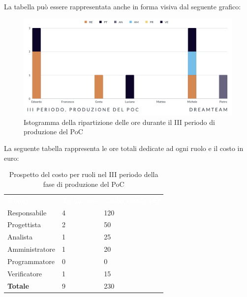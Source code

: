 La tabella può essere rappresentata anche in forma visiva dal seguente grafico:
\begin{figure}[H]
\centering
\includegraphics[scale=0.65]{Sezioni/SezioniPreventivo/grafici/Poc_III_periodo.png}
\caption{Istogramma della ripartizione delle ore durante il III periodo di produzione del PoC}
\end{figure}

La seguente tabella rappresenta le ore totali dedicate ad ogni ruolo e il costo in euro:

\begin{table}[H]
\begin{center}
\renewcommand{\arraystretch}{1.5}
\begin{tabular}{ m{}<{\centering}  m{}<{\centering} m{}<{\centering}}
	\rowcolor{darkblue}
	\textcolor{white}{\textbf{Ruolo}}&\textcolor{white}{\textbf{Totale ore}}&\textcolor{white}{\textbf{Costo totale (\euro)}}\\ 

	Responsabile  & 4 & 120\\	
	
	Progettista & 2 & 50\\
	
	Analista & 1 & 25 \\

	Amministratore & 1 & 20 \\
	
	Programmatore & 0 & 0 \\
	
	Verificatore & 1 & 15 \\
	
	\textbf{Totale} & 9 & 230 \\
	
\end{tabular}
\caption{Prospetto del costo per ruoli nel III periodo della fase di produzione del PoC}
\end{center}
\end{table}


